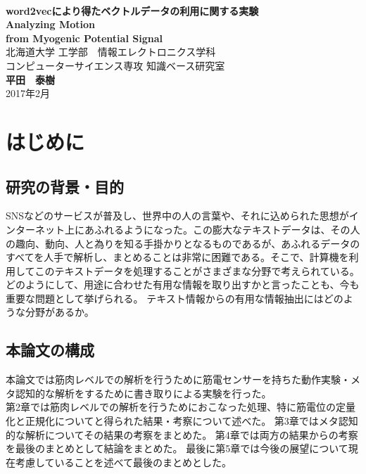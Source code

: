\documentclass[11pt,a4j,notitlepage]{jreport}
\def\HUGE{\fontsize{32pt}{36pt}\selectfont} %
\begin{document}
%
\begin{titlepage}
\begin{center}\begin{LARGE}
\vspace*{3.5em}{平成28年度　卒業論文}\vspace{1em}\\
\textbf{\HUGE word2vecにより得たベクトルデータの利用に関する実験}\\
\vspace{0.8em}
{\LARGE\bf Analyzing Motion \\from Myogenic Potential Signal}
\vspace{0.28\vsize}\\
{北海道大学 工学部　情報エレクトロニクス学科\\コンピューターサイエンス専攻 知識ベース研究室}\\\vspace{0.8em}
{\Huge\bf 平田　泰樹}\\
\vspace{1em}
{\Large 2017年2月}
\end{LARGE}\end{center}
\end{titlepage}

\tableofcontents

\chapter{はじめに}
\section{研究の背景・目的}
SNSなどのサービスが普及し、世界中の人の言葉や、それに込められた思想がインターネット上にあふれるようになった。この膨大なテキストデータは、その人の趣向、動向、人と為りを知る手掛かりとなるものであるが、あふれるデータのすべてを人手で解析し、まとめることは非常に困難である。そこで、計算機を利用してこのテキストデータを処理することがさまざまな分野で考えられている。どのようにして、用途に合わせた有用な情報を取り出すかと言ったことも、今も重要な問題として挙げられる。
テキスト情報からの有用な情報抽出にはどのような分野があるか。



\section{本論文の構成}
 本論文では筋肉レベルでの解析を行うために筋電センサーを持ちた動作実験・メタ認知的な解析をするために書き取りによる実験を行った。\\
第2章では筋肉レベルでの解析を行うためにおこなった処理、特に筋電位の定量化と正規化についてと得られた結果・考察について述べた。
第3章ではメタ認知的な解析についてその結果の考察をまとめた。
第4章では両方の結果からの考察を最後のまとめとして結論をまとめた。
最後に第5章では今後の展望について現在考慮していることを述べて最後のまとめとした。
\end{document}
